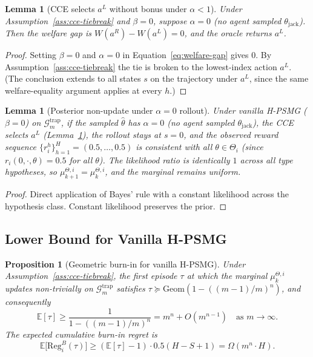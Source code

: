 \documentclass{article}
\newtheorem{proposition}[theorem]{Proposition}
\newtheorem{lemma}[theorem]{Lemma}
\begin{document}
\begin{lemma}[CCE selects $a^L$ without bonus under $\alpha < 1$]
\label{lem:cce-selects-aL}
Under Assumption~\ref{ass:cce-tiebreak} and $\beta = 0$, suppose $\alpha = 0$ (no agent sampled $\theta_{\mathrm{jack}}$). Then the welfare gap is $W(a^R) - W(a^L) = 0$, and the oracle returns $a^L$.
\end{lemma}

\begin{proof}
Setting $\beta = 0$ and $\alpha = 0$ in Equation~\eqref{eq:welfare-gap} gives $0$. By Assumption~\ref{ass:cce-tiebreak} the tie is broken to the lowest-index action $a^L$. (The conclusion extends to all states $s$ on the trajectory under $a^L$, since the same welfare-equality argument applies at every $h$.)
\end{proof}

\begin{lemma}[Posterior non-update under $\alpha = 0$ rollout]
\label{lem:posterior-stuck}
Under vanilla H-PSMG ($\beta = 0$) on $\mathcal{G}_m^{\mathrm{trap}}$, if the sampled $\hat\theta$ has $\alpha = 0$ (no agent sampled $\theta_{\mathrm{jack}}$), the CCE selects $a^L$ (Lemma~\ref{lem:cce-selects-aL}), the rollout stays at $s = 0$, and the observed reward sequence $\{r^h_i\}_{h=1}^H = (0.5, \ldots, 0.5)$ is consistent with all $\theta \in \Theta_i$ (since $r_i(0, \cdot, \theta) = 0.5$ for all $\theta$). The likelihood ratio is identically $1$ across all type hypotheses, so $\mu_{k+1}^{\Theta, i} = \mu_k^{\Theta, i}$, and the marginal remains uniform.
\end{lemma}

\begin{proof}
Direct application of Bayes' rule with a constant likelihood across the hypothesis class. Constant likelihood preserves the prior.
\end{proof}

\subsection{Lower Bound for Vanilla H-PSMG}
\label{app:hpsmg-plus-lower}

\begin{proposition}[Geometric burn-in for vanilla H-PSMG]
\label{prop:vanilla-burnin}
Under Assumption~\ref{ass:cce-tiebreak}, the first episode $\tau$ at which the marginal $\mu_k^{\Theta, i}$ updates non-trivially on $\mathcal{G}_m^{\mathrm{trap}}$ satisfies $\tau \succeq \mathrm{Geom}(1 - ((m-1)/m)^n)$, and consequently
\begin{equation}
\mathbb{E}[\tau] \geq \frac{1}{1 - ((m-1)/m)^n} = m^n + O(m^{n-1}) \quad \text{as } m \to \infty.
\end{equation}
The expected cumulative burn-in regret is
\begin{equation}
\mathbb{E}\big[\mathrm{Reg}_i^B(\tau)\big] \geq (\mathbb{E}[\tau] - 1) \cdot 0.5(H - S + 1) = \Omega(m^n \cdot H).
\end{equation}
\end{proposition}
\end{document}
